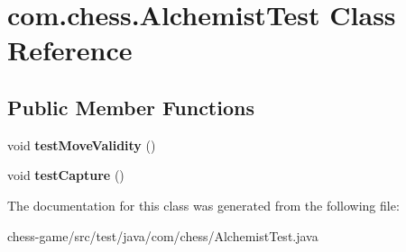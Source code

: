 \hypertarget{classcom_1_1chess_1_1_alchemist_test}{}\section{com.\+chess.\+Alchemist\+Test Class Reference}
\label{classcom_1_1chess_1_1_alchemist_test}
\subsection*{Public Member Functions}
\begin{DoxyCompactItemize}
\item 
\mbox{\label{classcom_1_1chess_1_1_alchemist_test_a701a47a24143c2956de907f6898d97d3}} 
void {\bfseries test\+Move\+Validity} ()
\item 
\mbox{\label{classcom_1_1chess_1_1_alchemist_test_ad7937200029f7e78ef273f3d8c9e6590}} 
void {\bfseries test\+Capture} ()
\end{DoxyCompactItemize}


The documentation for this class was generated from the following file\+:\begin{DoxyCompactItemize}
\item 
chess-\/game/src/test/java/com/chess/Alchemist\+Test.\+java\end{DoxyCompactItemize}

